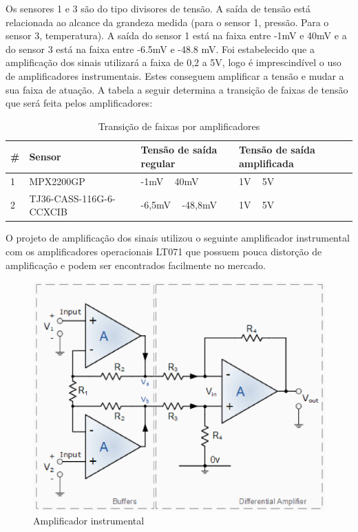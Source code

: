 Os sensores 1 e 3 são do tipo divisores de tensão. A saída de tensão está relacionada ao alcance da grandeza medida (para o sensor 1, pressão. Para o sensor 3, temperatura). A saída do sensor 1 está na faixa entre -1mV e 40mV e a do sensor 3 está na faixa entre -6.5mV e -48.8 mV.
Foi estabelecido que a amplificação dos sinais utilizará a faixa de 0,2 a 5V, logo é imprescindível o uso de amplificadores instrumentais. Estes conseguem amplificar a tensão e mudar a sua faixa de atuação. A tabela a seguir determina a transição de faixas de tensão que será feita pelos amplificadores:

\begin{table}[]
    \centering
    \begin{tabular}{|p{3cm}|p{5cm}|p{3cm}|p{3cm}|}
    \hline
    \textbf{\#} & \textbf{Sensor}    & \textbf{Tensão de saída regular} & \textbf{Tensão de saída amplificada} \\ \hline
    1      & MPX2200GP & -1mV ~ 40mV   & 1V ~ 5V  \\ \hline
    2 & TJ36-CASS-116G-6-CCXCIB & -6,5mV ~ -48,8mV & 1V ~ 5V \\ \hline
    \end{tabular}
    \caption{Transição de faixas por amplificadores}
    \end{table}

O projeto de amplificação dos sinais utilizou o seguinte amplificador instrumental com os amplificadores operacionais LT071 que possuem pouca distorção de amplificação e podem ser encontrados facilmente no mercado.

\begin{figure}[!h]                  
	\centering                          
	\includegraphics[scale=0.5]{figuras/IMG1.eps}
	\caption{ Amplificador instrumental}  \label{figamp1}           
\end{figure}

